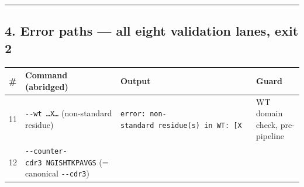 \documentclass[12pt,a4paper]{article}
\begin{document}
\begin{center}\rule{0.5\linewidth}{0.5pt}\end{center}

\hypertarget{error-paths-all-eight-validation-lanes-exit-2}{%
\subsection{4. Error paths --- all eight validation lanes, exit
2}\label{error-paths-all-eight-validation-lanes-exit-2}}

\begin{longtable}[]{@{}llll@{}}
\toprule
\begin{minipage}[b]{0.22\columnwidth}\raggedright
\#\strut
\end{minipage} & \begin{minipage}[b]{0.22\columnwidth}\raggedright
Command (abridged)\strut
\end{minipage} & \begin{minipage}[b]{0.22\columnwidth}\raggedright
Output\strut
\end{minipage} & \begin{minipage}[b]{0.22\columnwidth}\raggedright
Guard\strut
\end{minipage}\tabularnewline
\midrule
\endhead
\begin{minipage}[t]{0.22\columnwidth}\raggedright
11\strut
\end{minipage} & \begin{minipage}[t]{0.22\columnwidth}\raggedright
\texttt{-\/-wt\ \ldots{}X\ldots{}} (non-standard residue)\strut
\end{minipage} & \begin{minipage}[t]{0.22\columnwidth}\raggedright
\texttt{error:\ non-standard\ residue(s)\ in\ WT:\ {[}\textquotesingle{}X\textquotesingle{}{]}}\strut
\end{minipage} & \begin{minipage}[t]{0.22\columnwidth}\raggedright
WT domain check, pre-pipeline\strut
\end{minipage}\tabularnewline
\begin{minipage}[t]{0.22\columnwidth}\raggedright
12\strut
\end{minipage} & \begin{minipage}[t]{0.22\columnwidth}\raggedright
\texttt{-\/-counter-cdr3\ NGISHTKPAVGS} (= canonical
\texttt{-\/-cdr3})\strut
\end{minipage} & \begin{minipage}[t]{0.22\columnwidth}\raggedright

\end{minipage}
\end{longtable}
\end{document}
